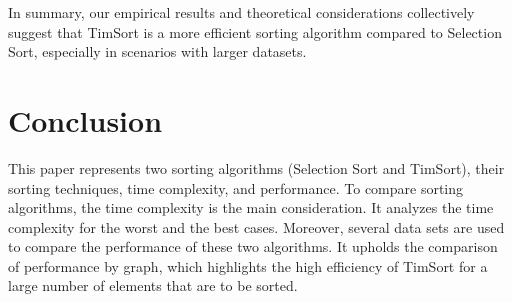 \documentclass[article,10pt]{article}
\begin{document}
\begin{multicols}{2}
  




In summary, our empirical results and theoretical considerations collectively suggest that TimSort is a more efficient sorting algorithm compared to Selection Sort, especially in scenarios with larger datasets.



\section{Conclusion}
This paper represents two sorting algorithms (Selection Sort and TimSort), their sorting techniques, time complexity, and performance. To compare sorting algorithms, the time complexity is the main consideration. It analyzes the time complexity for the worst and the best cases. Moreover, several data sets are used to compare the performance of these two algorithms. It upholds the comparison of performance by graph, which highlights the high efficiency of TimSort for a large number of elements that are to be sorted. 






\end{multicols}
\end{document}
